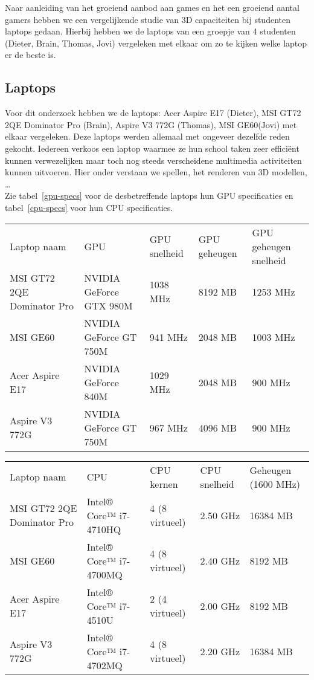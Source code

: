 Naar aanleiding van het groeiend aanbod aan games en het een groeiend aantal gamers hebben we een vergelijkende studie van 3D capaciteiten bij studenten laptops gedaan. Hierbij hebben we de laptops van een groepje van 4 studenten (Dieter, Brain, Thomas, Jovi) vergeleken met elkaar om zo te kijken welke laptop er de beste is. 
\subsection{Laptops}
Voor dit onderzoek hebben we de laptops: Acer Aspire E17 (Dieter), MSI GT72 2QE Dominator Pro (Brain), Aspire V3 772G (Thomas), MSI GE60(Jovi) met elkaar vergeleken. Deze laptops werden allemaal met ongeveer dezelfde reden gekocht. Iedereen verkoos een laptop waarmee ze hun school taken zeer effici{\"e}nt kunnen verwezelijken maar toch nog steeds verscheidene multimedia activiteiten kunnen uitvoeren. Hier onder verstaan we spellen, het renderen van 3D modellen, \dots \\
Zie tabel~\ref{gpu-specs} voor de desbetreffende laptops hun GPU specificaties en tabel~\ref{cpu-specs} voor hun CPU specificaties.
\begin{table*}[t]
\centering
\caption{GPU specificaties}
\label{gpu-specs}
\begin{tabular}{lllll}
Laptop naam                & GPU                     & GPU snelheid & GPU geheugen & GPU geheugen snelheid \\
MSI GT72 2QE Dominator Pro & NVIDIA GeForce GTX 980M & 1038 MHz  & 8192 MB    & 1253 MHz         \\
MSI GE60                   & NVIDIA GeForce GT 750M  & 941 MHz   & 2048 MB    & 1003 MHz          \\
Acer Aspire E17            & NVIDIA GeForce 840M     & 1029 MHz  & 2048 MB    & 900 MHz          \\
Aspire V3 772G             & NVIDIA GeForce GT 750M  & 967 MHz   & 4096 MB    & 900 MHz         
\end{tabular}
\end{table*}
\begin{table*}[t]
\centering
\caption{CPU \& Geheugen specificaties}
\label{cpu-specs}
\begin{tabular}{lllll}
Laptop naam				   & CPU                    & CPU kernen     & CPU snelheid	& Geheugen (1600 MHz)  \\
MSI GT72 2QE Dominator Pro & Intel® Core™ i7-4710HQ & 4 (8 virtueel) & 2.50 GHz	& 16384 MB	\\
MSI GE60                   & Intel® Core™ i7-4700MQ & 4 (8 virtueel) & 2.40 GHz	& 8192 MB	\\
Acer Aspire E17            & Intel® Core™ i7-4510U  & 2 (4 virtueel) & 2.00 GHz	& 8192 MB	\\
Aspire V3 772G             & Intel® Core™ i7-4702MQ & 4 (8 virtueel) & 2.20 GHz	& 16384 MB 
\end{tabular}
\end{table*}